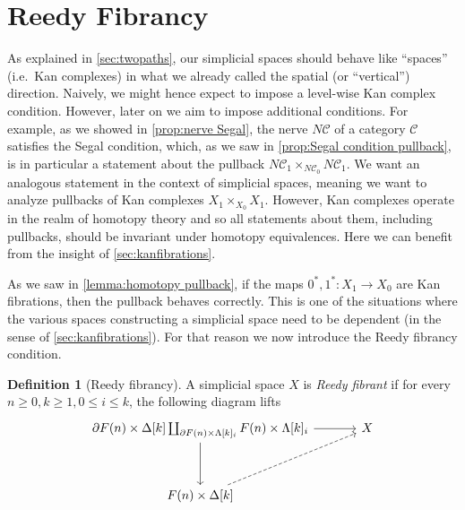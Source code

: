 \documentclass[11pt, a4paper]{amsart}
\newcommand{\cC}{\mathcal{C}}
\theoremstyle{definition}
\newtheorem{definition}[equation]{Definition}
\theoremstyle{remark}
\numberwithin{equation}{section}
\begin{document}
\section{Reedy Fibrancy} \label{sec:reedy}
As explained in \cref{sec:twopaths}, our simplicial spaces should behave like ``spaces'' (i.e.~Kan complexes) in what we already called the spatial (or ``vertical'') direction. Naively, we might hence expect to impose a level-wise Kan complex condition. However, later on we aim to impose additional conditions. For example, as we showed in \cref{prop:nerve Segal}, the nerve $N\cC$ of a category $\cC$ satisfies the Segal condition, which, as we saw in \cref{prop:Segal condition pullback}, is in particular a statement about the pullback $N\cC_1 \times_{N\cC_0} N\cC_1$.  We want an analogous statement in the context of simplicial spaces, meaning we want to analyze pullbacks of Kan complexes $X_1 \times_{X_0} X_1$. However, Kan complexes operate in the realm of homotopy theory and so all statements about them, including pullbacks, should be invariant under homotopy equivalences. Here we can benefit from the insight of \cref{sec:kanfibrations}. 

As we saw in \cref{lemma:homotopy pullback}, if the maps $0^*,1^*\colon X_1 \to X_0$ are Kan fibrations, then the pullback behaves correctly. This is one of the situations where the various spaces constructing a simplicial space need to be dependent (in the sense of \cref{sec:kanfibrations}). For that reason we now introduce the Reedy fibrancy condition.

\begin{definition}[Reedy fibrancy] \label{def:reedy}
  A simplicial space $X$ is \emph{Reedy fibrant} if for every $n \geq 0, k \geq 1, 0 \leq i \leq k$, the following diagram lifts 
  \[ 
  \begin{tikzcd}[row sep=1.2cm, column sep=1.2cm]
   \partial F(n) \times \Delta[k] \coprod_{\partial F(n) \times \Lambda[k]_i} F(n) \times \Lambda[k]_i \arrow[r] \arrow[d] & X \\
   F(n) \times \Delta[k] \arrow[ur, dashed]
  \end{tikzcd} 
  \]
\end{definition}
\end{document}
